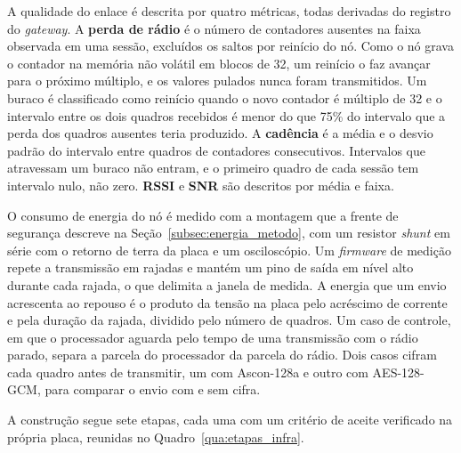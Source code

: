 A qualidade do enlace é descrita por quatro métricas, todas derivadas do registro do \textit{gateway}. A \textbf{perda de rádio} é o número de contadores ausentes na faixa observada em uma sessão, excluídos os saltos por reinício do nó. Como o nó grava o contador na memória não volátil em blocos de 32, um reinício o faz avançar para o próximo múltiplo, e os valores pulados nunca foram transmitidos. Um buraco é classificado como reinício quando o novo contador é múltiplo de 32 e o intervalo entre os dois quadros recebidos é menor do que 75\% do intervalo que a perda dos quadros ausentes teria produzido. A \textbf{cadência} é a média e o desvio padrão do intervalo entre quadros de contadores consecutivos. Intervalos que atravessam um buraco não entram, e o primeiro quadro de cada sessão tem intervalo nulo, não zero. \textbf{RSSI} e \textbf{SNR} são descritos por média e faixa.

O consumo de energia do nó é medido com a montagem que a frente de segurança descreve na Seção~\ref{subsec:energia_metodo}, com um resistor \textit{shunt} em série com o retorno de terra da placa e um osciloscópio. Um \textit{firmware} de medição repete a transmissão em rajadas e mantém um pino de saída em nível alto durante cada rajada, o que delimita a janela de medida. A energia que um envio acrescenta ao repouso é o produto da tensão na placa pelo acréscimo de corrente e pela duração da rajada, dividido pelo número de quadros. Um caso de controle, em que o processador aguarda pelo tempo de uma transmissão com o rádio parado, separa a parcela do processador da parcela do rádio. Dois casos cifram cada quadro antes de transmitir, um com Ascon-128a e outro com AES-128-GCM, para comparar o envio com e sem cifra.

A construção segue sete etapas, cada uma com um critério de aceite verificado na própria placa, reunidas no Quadro~\ref{qua:etapas_infra}.

